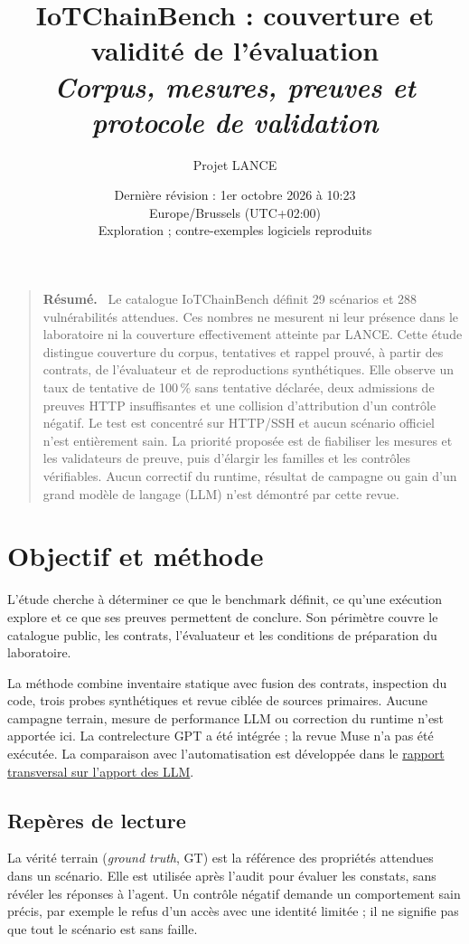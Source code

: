 \documentclass[11pt,a4paper]{article}
\title{\bfseries IoTChainBench : couverture et validité de l'évaluation\\[0.5em]\large\mdseries\itshape Corpus, mesures, preuves et protocole de validation}
\author{Projet LANCE}
\date{Dernière révision : 1er octobre 2026 à 10:23\\[0.15em]\small Europe/Brussels (UTC+02:00)\\[0.4em]\small Exploration ; contre-exemples logiciels reproduits}
\renewenvironment{abstract}
  {\begin{quote}\small\noindent\textbf{Résumé.}\ }
  {\par\end{quote}}
\begin{document}
\maketitle
\begin{abstract}
Le catalogue IoTChainBench définit 29 scénarios et 288 vulnérabilités attendues. Ces nombres ne mesurent ni leur présence dans le laboratoire ni la couverture effectivement atteinte par LANCE. Cette étude distingue couverture du corpus, tentatives et rappel prouvé, à partir des contrats, de l'évaluateur et de reproductions synthétiques. Elle observe un taux de tentative de 100\,\% sans tentative déclarée, deux admissions de preuves HTTP insuffisantes et une collision d'attribution d'un contrôle négatif. Le test est concentré sur HTTP/SSH et aucun scénario officiel n'est entièrement sain. La priorité proposée est de fiabiliser les mesures et les validateurs de preuve, puis d'élargir les familles et les contrôles vérifiables. Aucun correctif du runtime, résultat de campagne ou gain d'un grand modèle de langage (LLM) n'est démontré par cette revue.
\end{abstract}
\clearpage

\begingroup
\small
\tableofcontents
\endgroup
\clearpage

\section{Objectif et méthode}
L'étude cherche à déterminer ce que le benchmark définit, ce qu'une exécution
explore et ce que ses preuves permettent de conclure. Son périmètre couvre le
catalogue public, les contrats, l'évaluateur et les conditions de préparation
du laboratoire.

La méthode combine inventaire statique avec fusion des contrats, inspection du
code, trois probes synthétiques et revue ciblée de sources primaires.
Aucune campagne terrain, mesure de performance LLM ou correction du runtime
n'est apportée ici. La contrelecture GPT a été intégrée ; la revue Muse n'a pas
été exécutée. La comparaison avec l'automatisation est développée dans le
\href{../2026-09-27-agent-vs-automation/report.pdf}{rapport transversal sur l'apport des LLM}.

\subsection{Repères de lecture}
La vérité terrain (\emph{ground truth}, GT) est la référence des propriétés
attendues dans un scénario. Elle est utilisée après l'audit pour évaluer les
constats, sans révéler les réponses à l'agent. Un contrôle négatif demande un
comportement sain précis, par exemple le refus d'un accès avec une identité
limitée ; il ne signifie pas que tout le scénario est sans faille.
\end{document}
